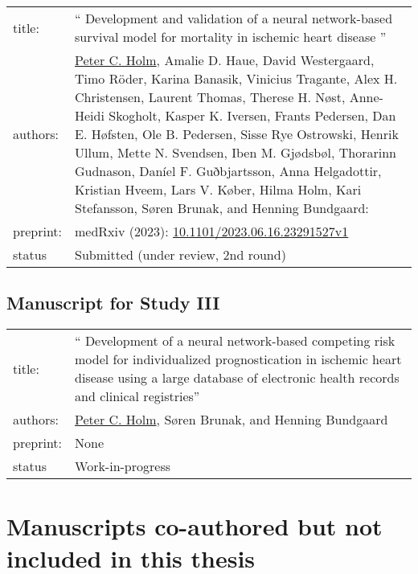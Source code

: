 {\small
\begin{tabularx}{\textwidth}{lX}
    title: & 
    \enquote{%
        Development and validation of a neural network-based survival model 
        for mortality in ischemic heart disease%
    } \\
    authors: &
    \raggedright\arraybackslash
    \underline{Peter C. Holm},
    Amalie D. Haue,  David Westergaard, Timo Röder, Karina Banasik, Vinicius
    Tragante, Alex H. Christensen,  Laurent Thomas,  Therese H. Nøst,
    Anne-Heidi Skogholt, Kasper K. Iversen, Frants Pedersen, Dan E. Høfsten,
    Ole B. Pedersen,  Sisse Rye Ostrowski, Henrik Ullum, Mette N. Svendsen,
    Iben M. Gjødsbøl, Thorarinn Gudnason, Daníel F. Guðbjartsson,  Anna
    Helgadottir, Kristian Hveem,  Lars V. Køber,  Hilma Holm, Kari Stefansson,
    Søren Brunak,  and Henning Bundgaard:
    \\
    preprint: & medRxiv (2023):
    \href{https://doi.org/10.1101/2023.06.16.23291527v1}%
         {10.1101/2023.06.16.23291527v1} \\
    status & Submitted (under review, 2nd round)
\end{tabularx}}

\subsection*{Manuscript for Study III}

{\small
\begin{tabularx}{\textwidth}{lX}
    title: & 
    \enquote{%
        Development of a neural network-based competing risk model 
        for individualized prognostication in ischemic heart disease 
        using a large database of electronic health records 
        and clinical registries}
    \\
    authors: &
    \raggedright\arraybackslash
    \underline{Peter C. Holm},
    Søren Brunak, and Henning Bundgaard
    \\
    preprint: & None \\
    status & Work-in-progress
\end{tabularx}}

\clearpage
\section*{Manuscripts co-authored but not included in this thesis}

